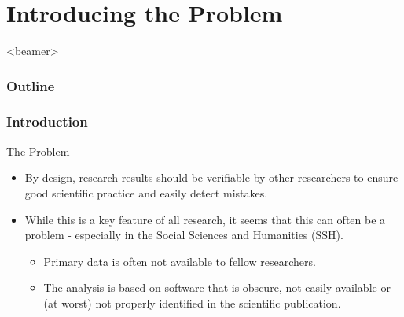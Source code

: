 \documentclass[]{beamer}
\title[\myshorttitle]{\mytitle}
\subtitle{\mysubtitle}
\author[\myshortauthor]{\myauthor \\ {\tt<\mymail>}}
\institute[\myshortinstitute]{\myinstitute}
\date{\mydate}
\begin{document}
\begin{frame}
	\titlepage
\end{frame}

%
%


%
%

%
%
\section[p.one]{Introducing the Problem}
{%
\begin{frame}<beamer>
    \frametitle{Outline}
\tableofcontents[currentsection]
\end{frame}
}

	\begin{frame}
		\frametitle{Introduction}
		\begin{block}{The Problem}
			\begin{itemize}
				\item By design, research results should be verifiable by other researchers to ensure good scientific practice and easily detect mistakes.
				\pause
				\item While this is a key feature of all research, it seems that this can often be a problem - especially in the Social Sciences and Humanities (SSH).
				\pause
				\begin{itemize}
					\item Primary data is often not available to fellow researchers.
					\pause
					\item The analysis is based on software that is obscure, not easily available or (at worst) not properly identified in the scientific publication.
				\end{itemize}
		   \end{itemize}
	   \end{block}
	\end{frame}
\end{document}
